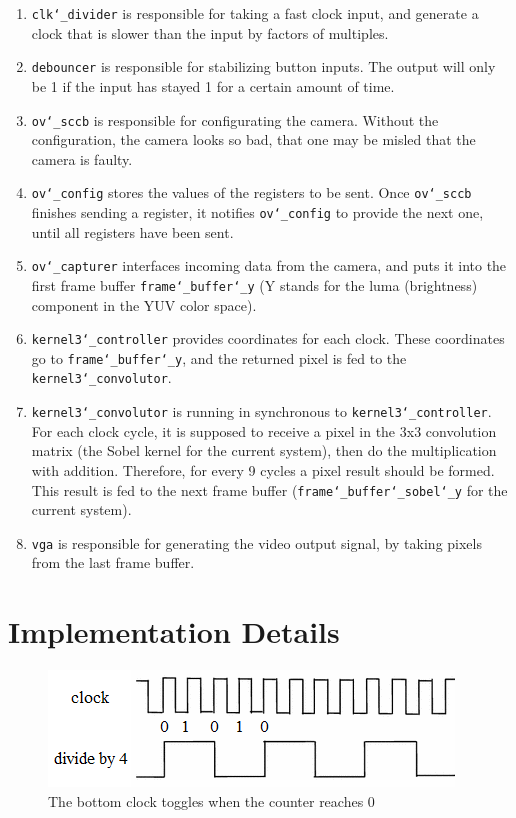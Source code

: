 \documentclass{article}
\begin{document}
	\begin{enumerate}
		\item \texttt{clk\char`_divider} is responsible for taking a fast clock input, and generate a clock that is slower than the input by factors of multiples.
		\item \texttt{debouncer} is responsible for stabilizing button inputs. The output will only be 1 if the input has stayed 1 for a certain amount of time.
		\item \texttt{ov\char`_sccb} is responsible for configurating the camera. Without the configuration, the camera looks so bad, that one may be misled that the camera is faulty.
		\item \texttt{ov\char`_config} stores the values of the registers to be sent. Once \texttt{ov\char`_sccb} finishes sending a register, it notifies \texttt{ov\char`_config} to provide the next one, until all registers have been sent.
		\item \texttt{ov\char`_capturer} interfaces incoming data from the camera, and puts it into the first frame buffer \texttt{frame\char`_buffer\char`_y} (Y stands for the luma (brightness) component in the YUV color space).
		\item \texttt{kernel3\char`_controller} provides coordinates for each clock. These coordinates go to \texttt{frame\char`_buffer\char`_y}, and the returned pixel is fed to the \texttt{kernel3\char`_convolutor}.
		\item \texttt{kernel3\char`_convolutor} is running in synchronous to \texttt{kernel3\char`_controller}. For each clock cycle, it is supposed to receive a pixel in the 3x3 convolution matrix (the Sobel kernel for the current system), then do the multiplication with addition. Therefore, for every 9 cycles a pixel result should be formed. This result is fed to the next frame buffer (\texttt{frame\char`_buffer\char`_sobel\char`_y} for the current system).
		\item \texttt{vga} is responsible for generating the video output signal, by taking pixels from the last frame buffer.
	\end{enumerate}
	\newpage\section{Implementation Details}
	\begin{figure}[h]
		\centering
		\includegraphics[scale=0.8]{clockdivider}
		\caption{The bottom clock toggles when the counter reaches 0}
		\label{fig:clockdivider}
	\end{figure}
\end{document}
